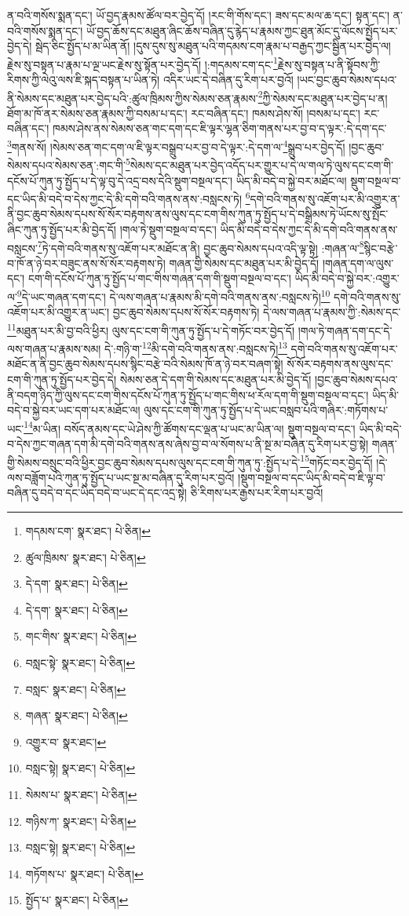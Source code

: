 ན་བའི་གསོས་སྨན་དང་། ཡོ་བྱད་རྣམས་ཚོལ་བར་བྱེད་དོ། །རང་གི་གོས་དང་། ཟས་དང་མལ་ཆ་དང་། སྟན་དང་། ན་བའི་གསོས་སྨན་དང་། ཡོ་བྱད་ཆོས་དང་མཐུན་ཞིང་ཆོས་བཞིན་དུ་རྙེད་པ་རྣམས་ཀྱང་ཐུན་མོང་དུ་ལོངས་སྤྱོད་པར་བྱེད་དེ། སྦེད་ཅིང་སྤྱོད་པ་མ་ཡིན་ནོ། །དུས་དུས་སུ་མཐུན་པའི་གདམས་ངག་རྣམ་པ་བརྒྱད་ཀྱང་སྦྱིན་པར་བྱེད་ལ། རྗེས་སུ་བསྟན་པ་རྣམ་པ་ལྔ་ཡང་རྗེས་སུ་སྟོན་པར་བྱེད་དོ། །:གདམས་ངག་དང་\footnote{གདམས་ངག་  སྣར་ཐང་།  པེ་ཅིན། }རྗེས་སུ་བསྟན་པ་ནི་སྟོབས་ཀྱི་རིགས་ཀྱི་ལེའུ་ལས་ཇི་སྐད་བསྟན་པ་ཡིན་ཏེ། འདིར་ཡང་དེ་བཞིན་དུ་རིག་པར་བྱའོ། །ཡང་བྱང་ཆུབ་སེམས་དཔའ་ནི་སེམས་དང་མཐུན་པར་བྱེད་པའི་:ཚུལ་ཁྲིམས་ཀྱིས་སེམས་ཅན་རྣམས་\footnote{ཚུལ་ཁྲིམས་  སྣར་ཐང་།  པེ་ཅིན། }ཀྱི་སེམས་དང་མཐུན་པར་བྱེད་པ་ན། ཐོག་མ་ཁོ་ནར་སེམས་ཅན་རྣམས་ཀྱི་བསམ་པ་དང་། རང་བཞིན་དང་། ཁམས་ཤེས་སོ། །བསམ་པ་དང་། རང་བཞིན་དང་། ཁམས་ཤེས་ནས་སེམས་ཅན་གང་དག་དང་ཇི་ལྟར་ལྷན་ཅིག་གནས་པར་བྱ་བ་ད་ལྟར་:དེ་དག་དང་\footnote{དེ་དག་  སྣར་ཐང་།  པེ་ཅིན། }གནས་སོ། །སེམས་ཅན་གང་དག་ལ་ཇི་ལྟར་བསྒྲུབ་པར་བྱ་བ་དེ་ལྟར་:དེ་དག་ལ་\footnote{དེ་དག་  སྣར་ཐང་།  པེ་ཅིན། }སྒྲུབ་པར་བྱེད་དོ། །བྱང་ཆུབ་སེམས་དཔའ་སེམས་ཅན་:གང་གི་\footnote{གང་གིས་  སྣར་ཐང་།  པེ་ཅིན། }སེམས་དང་མཐུན་པར་བྱེད་འདོད་པར་གྱུར་པ་དེ་ལ་གལ་ཏེ་ལུས་དང་ངག་གི་དངོས་པོ་ཀུན་ཏུ་སྤྱོད་པ་དེ་ལྟ་བུ་དེ་འདྲ་བས་དེའི་སྡུག་བསྔལ་དང་། ཡིད་མི་བདེ་བ་སྐྱེ་བར་མཐོང་ལ། སྡུག་བསྔལ་བ་དང་ཡིད་མི་བདེ་བ་དེས་ཀྱང་དེ་མི་དགེ་བའི་གནས་ནས་:བསླངས་ཏེ། \footnote{བསླང་སྟེ་  སྣར་ཐང་།  པེ་ཅིན། }དགེ་བའི་གནས་སུ་འཇོག་པར་མི་འགྱུར་ན་ནི་བྱང་ཆུབ་སེམས་དཔས་སོ་སོར་བརྟགས་ནས་ལུས་དང་ངག་གིས་ཀུན་ཏུ་སྤྱོད་པ་དེ་བསྒྲིམས་ཏེ་ཡོངས་སུ་སྤོང་ཞིང་ཀུན་ཏུ་སྤྱོད་པར་མི་བྱེད་དོ། །གལ་ཏེ་སྡུག་བསྔལ་བ་དང་། ཡིད་མི་བདེ་བ་དེས་ཀྱང་དེ་མི་དགེ་བའི་གནས་ནས་བསླངས་\footnote{བསླང་  སྣར་ཐང་།  པེ་ཅིན། }ཏེ་དགེ་བའི་གནས་སུ་འཇོག་པར་མཐོང་ན་ནི། བྱང་ཆུབ་སེམས་དཔའ་འདི་ལྟ་སྟེ། :གཞན་ལ་\footnote{གཞན་  སྣར་ཐང་།  པེ་ཅིན། }སྙིང་བརྩེ་བ་ཁོ་ན་ཉེ་བར་བཟུང་ནས་སོ་སོར་བརྟགས་ཏེ། གཞན་གྱི་སེམས་དང་མཐུན་པར་མི་བྱེད་དོ། །གཞན་དག་ལ་ལུས་དང་། ངག་གི་དངོས་པོ་ཀུན་ཏུ་སྤྱོད་པ་གང་གིས་གཞན་དག་གི་སྡུག་བསྔལ་བ་དང་། ཡིད་མི་བདེ་བ་སྐྱེ་བར་:འགྱུར་ལ་\footnote{འགྱུར་བ་  སྣར་ཐང་། }དེ་ཡང་གཞན་དག་དང་། དེ་ལས་གཞན་པ་རྣམས་མི་དགེ་བའི་གནས་ནས་:བསླངས་ཏེ།\footnote{བསླང་སྟེ།  སྣར་ཐང་།  པེ་ཅིན། } དགེ་བའི་གནས་སུ་འཇོག་པར་མི་འགྱུར་ན་ཡང་། བྱང་ཆུབ་སེམས་དཔས་སོ་སོར་བརྟགས་ཏེ། དེ་ལས་གཞན་པ་རྣམས་ཀྱི་:སེམས་དང་\footnote{སེམས་པ་  སྣར་ཐང་།  པེ་ཅིན། }མཐུན་པར་མི་བྱ་བའི་ཕྱིར། ལུས་དང་ངག་གི་ཀུན་ཏུ་སྤྱོད་པ་དེ་གཏོང་བར་བྱེད་དོ། །གལ་ཏེ་གཞན་དག་དང་དེ་ལས་གཞན་པ་རྣམས་སམ། དེ་:གཉི་ག་\footnote{གཉིས་ཀ་  སྣར་ཐང་།  པེ་ཅིན། }མི་དགེ་བའི་གནས་ནས་:བསླངས་ཏེ།\footnote{བསླང་སྟེ།  སྣར་ཐང་།  པེ་ཅིན། } དགེ་བའི་གནས་སུ་འཇོག་པར་མཐོང་ན་ནི་བྱང་ཆུབ་སེམས་དཔས་སྙིང་བརྩེ་བའི་སེམས་ཁོ་ན་ཉེ་བར་བཞག་སྟེ། སོ་སོར་བརྟགས་ནས་ལུས་དང་ངག་གི་ཀུན་ཏུ་སྤྱོད་པར་བྱེད་དེ། སེམས་ཅན་དེ་དག་གི་སེམས་དང་མཐུན་པར་མི་བྱེད་དོ། །བྱང་ཆུབ་སེམས་དཔའ་ནི་བདག་ཉིད་ཀྱི་ལུས་དང་ངག་གིས་དངོས་པོ་ཀུན་ཏུ་སྤྱོད་པ་གང་གིས་ཕ་རོལ་དག་གི་སྡུག་བསྔལ་བ་དང་། ཡིད་མི་བདེ་བ་སྐྱེ་བར་ཡང་དག་པར་མཐོང་ལ། ལུས་དང་ངག་གི་ཀུན་ཏུ་སྤྱོད་པ་དེ་ཡང་བསླབ་པའི་གཞིར་:གཏོགས་པ་ཡང་\footnote{གཏོགས་པ་  སྣར་ཐང་།  པེ་ཅིན། }མ་ཡིན། བསོད་ནམས་དང་ཡེ་ཤེས་ཀྱི་ཚོགས་དང་ལྡན་པ་ཡང་མ་ཡིན་ལ། སྡུག་བསྔལ་བ་དང་། ཡིད་མི་བདེ་བ་དེས་ཀྱང་གཞན་དག་མི་དགེ་བའི་གནས་ནས་ཞེས་བྱ་བ་ལ་སོགས་པ་ནི་སྔ་མ་བཞིན་དུ་རིག་པར་བྱ་སྟེ། གཞན་གྱི་སེམས་བསྲུང་བའི་ཕྱིར་བྱང་ཆུབ་སེམས་དཔས་ལུས་དང་ངག་གི་ཀུན་ཏུ་:སྤྱོད་པ་དེ་\footnote{སྤྱོད་པ་  སྣར་ཐང་།  པེ་ཅིན། }གཏོང་བར་བྱེད་དོ། །དེ་ལས་བཟློག་པའི་ཀུན་ཏུ་སྤྱོད་པ་ཡང་སྔ་མ་བཞིན་དུ་རིག་པར་བྱའོ། །སྡུག་བསྔལ་བ་དང་ཡིད་མི་བདེ་བ་ཇི་ལྟ་བ་བཞིན་དུ་བདེ་བ་དང་ཡིད་བདེ་བ་ཡང་དེ་དང་འདྲ་སྟེ། ཅི་རིགས་པར་རྒྱས་པར་རིག་པར་བྱའོ། 